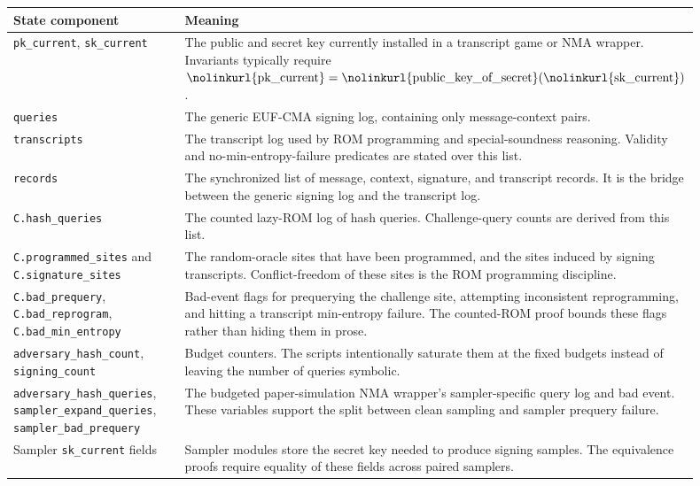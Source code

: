 \documentclass[11pt]{report}
\DeclareRobustCommand{\ec}[1]{\ifmmode\text{\nolinkurl{#1}}\else\nolinkurl{#1}\fi}
\theoremstyle{definition}
\theoremstyle{plain}
\begin{document}
\begin{longtable}{p{0.28\linewidth}p{0.62\linewidth}}
\toprule
\textbf{State component} & \textbf{Meaning} \\
\midrule
\ec{pk\_current}, \ec{sk\_current} &
The public and secret key currently installed in a transcript game or NMA
wrapper.  Invariants typically require \(\ec{pk\_current} =
\ec{public\_key\_of\_secret}(\ec{sk\_current})\). \\
\ec{queries} &
The generic EUF-CMA signing log, containing only message-context pairs. \\
\ec{transcripts} &
The transcript log used by ROM programming and special-soundness reasoning.
Validity and no-min-entropy-failure predicates are stated over this list. \\
\ec{records} &
The synchronized list of message, context, signature, and transcript records.
It is the bridge between the generic signing log and the transcript log. \\
\ec{C.hash\_queries} &
The counted lazy-ROM log of hash queries.  Challenge-query counts are derived
from this list. \\
\ec{C.programmed\_sites} and \ec{C.signature\_sites} &
The random-oracle sites that have been programmed, and the sites induced by
signing transcripts.  Conflict-freedom of these sites is the ROM programming
discipline. \\
\ec{C.bad\_prequery}, \ec{C.bad\_reprogram},
\ec{C.bad\_min\_entropy} &
Bad-event flags for prequerying the challenge site, attempting inconsistent
reprogramming, and hitting a transcript min-entropy failure.  The counted-ROM
proof bounds these flags rather than hiding them in prose. \\
\ec{adversary\_hash\_count}, \ec{signing\_count} &
Budget counters.  The scripts intentionally saturate them at the fixed budgets
instead of leaving the number of queries symbolic. \\
\ec{adversary\_hash\_queries},
\ec{sampler\_expand\_queries},
\ec{sampler\_bad\_prequery} &
The budgeted paper-simulation NMA wrapper's sampler-specific query log and bad
event.  These variables support the split between clean sampling and sampler
prequery failure. \\
Sampler \ec{sk\_current} fields &
Sampler modules store the secret key needed to produce signing samples.  The
equivalence proofs require equality of these fields across paired samplers. \\
\bottomrule
\end{longtable}
\end{document}
